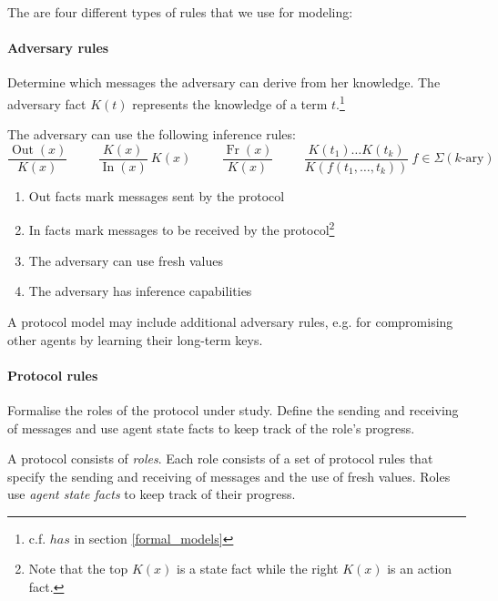 The are four different types of rules that we use for modeling:

\paragraph{Adversary rules} Determine which messages the adversary can derive from her knowledge. The adversary fact $K(t)$ represents the knowledge of a term $t$.\footnote{c.f. $has$ in section \ref{formal_models}}

The adversary can use the following inference rules:
$$
\frac{\operatorname{Out}(x)}{K(x)} \hspace{1cm}
\frac{K(x)}{\operatorname{In}(x)} ~ K(x) \hspace{1cm}
\frac{\operatorname{Fr}(x)}{K(x)} \hspace{1cm}
\frac{K(t_1)\dots K(t_k)}{K(f(t_1,\dots,t_k))} ~ f \in \Sigma(k\text{-ary}) 
$$

\begin{enumerate}[(1)]
    \item Out facts mark messages sent by the protocol
    \item In facts mark messages to be received by the protocol\footnote{Note that the top $K(x)$ is a state fact while the right $K(x)$ is an action fact.}
    \item The adversary can use fresh values
    \item The adversary has inference capabilities
\end{enumerate}

A protocol model may include additional adversary rules, e.g. for compromising other agents by
learning their long-term keys.

\paragraph{Protocol rules} Formalise the roles of the protocol under study. Define the sending and receiving of messages and use agent state facts to keep track of the role’s progress.

A protocol consists of \emph{roles}. Each role consists of a set of protocol rules that specify the sending and receiving of messages and the use of fresh values. Roles use \emph{agent state facts} to keep track of their progress.



